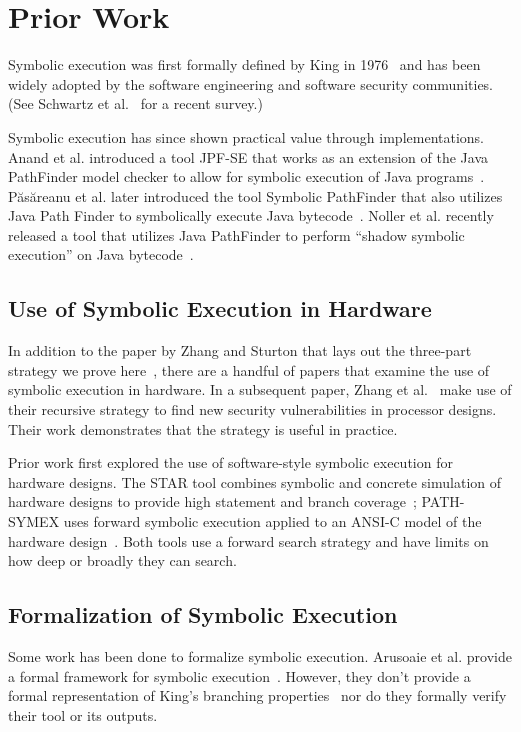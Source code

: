 \section{Prior Work}
Symbolic execution was first formally defined by King in 1976~\cite{king1976symbolic} and has
been widely adopted by the software engineering and software security
communities. (See Schwartz et al.~\cite{schwartz2010all} for a recent survey.)

Symbolic execution has since shown practical value through implementations. Anand et al. introduced a tool JPF-SE that works as an extension of the Java PathFinder model checker to allow for symbolic execution of Java programs~\cite{anand2007jpf}.  P{\u{a}}s{\u{a}}reanu et al. later introduced the tool Symbolic PathFinder that also utilizes Java Path Finder to symbolically execute Java bytecode~\cite{puasuareanu2010symbolic}. Noller et al. recently released a tool that utilizes Java PathFinder to perform ``shadow symbolic execution'' on Java bytecode~\cite{Noller2018}.

\subsection{Use of Symbolic Execution in Hardware}
In addition to the paper by Zhang and Sturton that lays out the three-part
strategy we prove here~\cite{zhang2018recursive}, there are a handful of papers that examine
the use of symbolic execution in hardware. In a subsequent paper, Zhang et
al.~\cite{zhang2018recursive} make use of their recursive strategy to find new security
vulnerabilities in processor designs. Their work demonstrates that the strategy
is useful in practice.

Prior work first explored the use of software-style symbolic execution for hardware designs. The STAR tool combines symbolic and concrete simulation of hardware designs to
provide high statement and branch coverage~\cite{liu2009star}; PATH-SYMEX uses
forward symbolic execution applied to an ANSI-C model of the hardware
design~\cite{mukherjee2015hardware}. Both tools use a forward search strategy
and have limits on how deep or broadly they can search.

\subsection{Formalization of Symbolic Execution}

Some work has been done to formalize symbolic execution. 
Arusoaie et al. provide a formal framework for symbolic execution~\cite{arusoaie2014generic,arusoaie2015symbolic,lucanu2017generic}. 
However, they don't provide a formal representation of King's branching properties~\cite{king1976symbolic} nor do they formally verify their tool or its outputs. 

